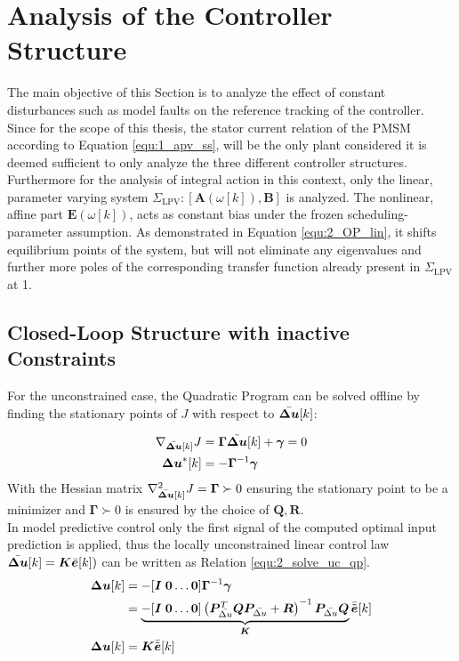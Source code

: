 \section{Analysis of the Controller Structure}\label{sec:mpcc_analysis}
The main objective of this Section is to analyze the effect of constant disturbances such as model faults on the reference tracking of the controller. Since for the scope of this thesis, the stator current relation of the PMSM according to Equation \eqref{equ:1_apv_ss}, will be the only plant considered it is deemed sufficient to only analyze the three different controller structures.\\
Furthermore for the analysis of integral action in this context, only the linear, parameter varying system $\Sigma_{\mathrm{LPV}}: \left[\bm{A}(\omega[k]), \bm{B} \right]$ is analyzed. The nonlinear, affine part $\bm{E}(\omega[k])$, acts as constant bias under the frozen scheduling-parameter assumption. As demonstrated in Equation \eqref{equ:2_OP_lin}, it shifts equilibrium points of the system, but will not eliminate any eigenvalues and further more poles of the corresponding transfer function already present in $\Sigma_{\mathrm{LPV}}$ at 1. 

\subsection{Closed-Loop Structure with inactive Constraints}
For the unconstrained case, the  Quadratic Program can be solved offline by finding the stationary points of $J$ with respect to $\Bar{\bm{\Delta u}}[k]$:

\begin{align*}
	\nabla_{\Bar{\bm{\Delta u}}[k]} J &= \bm{\Gamma}\Bar{\bm{\Delta u}}[k] + \bm{\gamma} = 0 \\
		{\bm{\Delta u}}^* [k] &= -\bm{\Gamma}^{-1} \bm{\gamma}
\end{align*}
With  the Hessian matrix $ \nabla_{\Bar{\bm{\Delta u}}[k]}^2 J = \bm{\Gamma}  \succ 0 $ ensuring the stationary point to be a minimizer and $\bm{\Gamma}  \succ 0$ is ensured by the choice of $\bm{Q, R}$.\\

In model predictive control only the first signal of the computed optimal input prediction is applied, thus the locally unconstrained  linear control law $\Bar{\bm{\Delta u}}[k] =\bm{K}{\Bar{\bm{e}}}[k])$ can be written as  Relation \eqref{equ:2_solve_uc_qp}.
\begin{align}
	\bm{\Delta u} [k] & = -[\bm{I}\; \bm{0} \hdots \bm{0}]\bm{\Gamma}^{-1} \bm{\gamma} \\
	&= \underbrace{-[\bm{I}\; \bm{0} \hdots \bm{0}] \left(\bm{P}_{\Bar{\Delta u}}^T \bm{Q} \bm{P}_{\Bar{\Delta u}} +  \bm{R} \right)^{-1} \bm{P}_{\Bar{\Delta u}} \bm{Q}}_{\bm{K}} \Bar{\Tilde{\bm{e}}}[k] \\
	{\bm{\Delta u}}[k] &= \bm{K} \Bar{\Tilde{\bm{e}}}[k] 
	\label{equ:2_solve_uc_qp}
\end{align}

